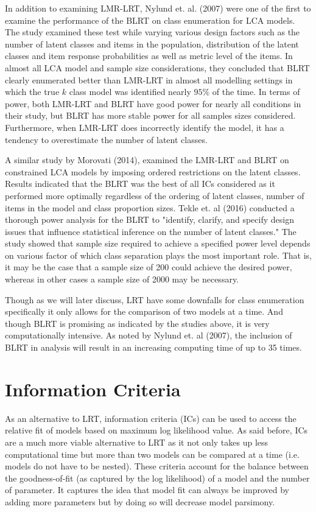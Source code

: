 In addition to examining LMR-LRT, Nylund et. al. (2007) were one of the first to examine the performance of the BLRT on class enumeration for LCA models. The study examined these test while varying various design factors such as the number of latent classes and items in the population, distribution of the latent classes and item response probabilities as well as metric level of the items. In almost all LCA model and sample size considerations, they concluded that BLRT clearly enumerated better than LMR-LRT in almost all modelling settings in which the true $k$ class model was identified nearly $95\%$ of the time. In terms of power, both LMR-LRT and BLRT have good power for nearly all conditions in their study, but BLRT has more stable power for all samples sizes considered. Furthermore, when LMR-LRT does incorrectly identify the model, it has a tendency to overestimate the number of latent classes.

A similar study by Morovati (2014), examined the LMR-LRT and BLRT on constrained LCA models by imposing ordered restrictions on the latent classes. Results indicated that the BLRT was the best of all ICs considered as it performed more optimally regardless of the ordering of latent classes, number of items in the model and class proportion sizes. Tekle et. al (2016) conducted a thorough power analysis for the BLRT to "identify, clarify, and specify design issues that influence statistical inference on the number of latent classes." The study showed that sample size required to achieve a specified power level depends on various factor of which class separation plays the most important role. That is, it may be the case that a sample size of 200 could achieve the desired power, whereas in other cases a sample size of 2000 may be necessary. 

Though as we will later discuss, LRT have some downfalls for class enumeration specifically it only allows for the comparison of two models at a time. And though BLRT is promising as indicated by the studies above, it is very computationally intensive. As noted by Nylund et. al (2007), the inclusion of BLRT in analysis will result in an increasing computing time of up to 35 times. 


\section{Information Criteria}
\hspace{2em} As an alternative to LRT, information criteria (ICs) can be used to access the relative fit of models based on maximum log likelihood value. As said before, ICs are a much more viable alternative to LRT as it not only takes up less computational time but more than two models can be compared at a time (i.e. models do not have to be nested). These criteria account for the balance between the goodness-of-fit (as captured by the log likelihood) of a model and the number of parameter. It captures the idea that model fit can always be improved by adding more parameters but by doing so will decrease model parsimony. 

